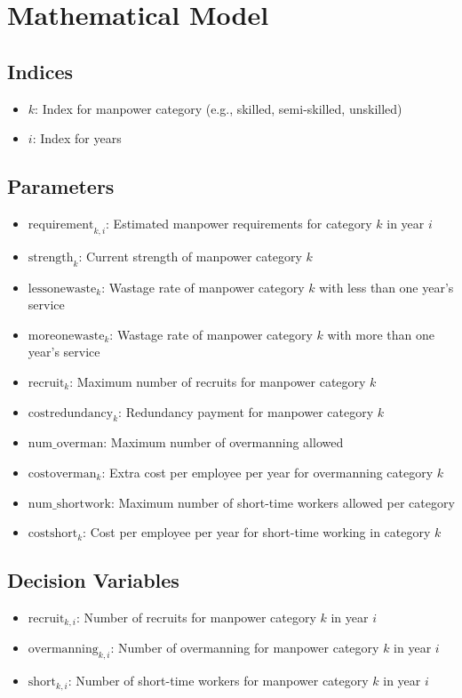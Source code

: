 \documentclass{article}
\begin{document}
\section*{Mathematical Model}

\subsection*{Indices}
\begin{itemize}
    \item \( k \): Index for manpower category (e.g., skilled, semi-skilled, unskilled)
    \item \( i \): Index for years
\end{itemize}

\subsection*{Parameters}
\begin{itemize}
    \item \( \text{requirement}_{k, i} \): Estimated manpower requirements for category \( k \) in year \( i \)
    \item \( \text{strength}_{k} \): Current strength of manpower category \( k \)
    \item \( \text{lessonewaste}_{k} \): Wastage rate of manpower category \( k \) with less than one year's service
    \item \( \text{moreonewaste}_{k} \): Wastage rate of manpower category \( k \) with more than one year's service
    \item \( \text{recruit}_{k} \): Maximum number of recruits for manpower category \( k \)
    \item \( \text{costredundancy}_{k} \): Redundancy payment for manpower category \( k \)
    \item \( \text{num\_overman} \): Maximum number of overmanning allowed
    \item \( \text{costoverman}_{k} \): Extra cost per employee per year for overmanning category \( k \)
    \item \( \text{num\_shortwork} \): Maximum number of short-time workers allowed per category
    \item \( \text{costshort}_{k} \): Cost per employee per year for short-time working in category \( k \)
\end{itemize}

\subsection*{Decision Variables}
\begin{itemize}
    \item \( \text{recruit}_{k,i} \): Number of recruits for manpower category \( k \) in year \( i \)
    \item \( \text{overmanning}_{k,i} \): Number of overmanning for manpower category \( k \) in year \( i \)
    \item \( \text{short}_{k,i} \): Number of short-time workers for manpower category \( k \) in year \( i \)
\end{itemize}
\end{document}
